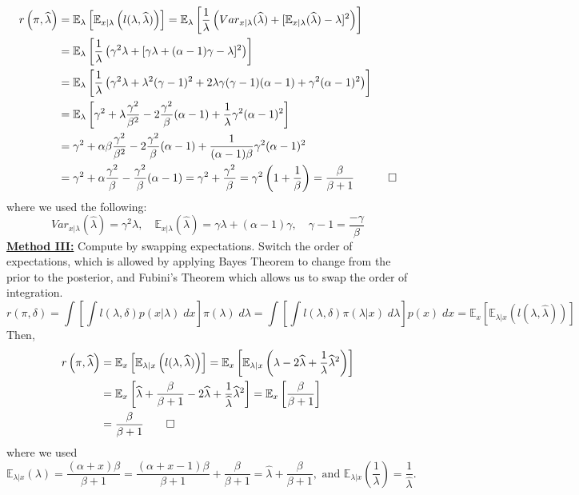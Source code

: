 \documentclass[11pt]{report}
\begin{document}
\begin{align*}
r\left(\pi, \widehat{\lambda}\right)
& = \mathbb{E}_\lambda\left[\mathbb{E}_{x|\lambda}\left(l(\lambda, \widehat{\lambda})\right) \right] 
= \mathbb{E}_\lambda\left[\frac{1}{\lambda}\left(Var_{x|\lambda}(\widehat{\lambda}) + [\mathbb{E}_{x|\lambda}(\widehat{\lambda}) -\lambda]^2 \right) \right] \\
& = \mathbb{E}_\lambda\left[\frac{1}{\lambda}\left(\gamma^2\lambda + [\gamma\lambda + (\alpha-1)\gamma-\lambda]^2 \right) \right] \\
& = \mathbb{E}_\lambda\left[\frac{1}{\lambda}\left(\gamma^2\lambda + \lambda^2(\gamma-1)^2 + 2\lambda\gamma(\gamma-1)(\alpha-1) + \gamma^2(\alpha-1)^2 \right) \right] \\
& = \mathbb{E}_\lambda\left[\gamma^2 + \lambda\frac{\gamma^2}{\beta^2} - 2\frac{\gamma^2}{\beta}(\alpha-1) + \frac{1}{\lambda}\gamma^2(\alpha-1)^2  \right] \\ 		
& = \gamma^2 + \alpha\beta\frac{\gamma^2}{\beta^2} - 2\frac{\gamma^2}{\beta}(\alpha-1) + \frac{1}{(\alpha-1)\beta}\gamma^2(\alpha-1)^2 \\   
& = \gamma^2 + \alpha\frac{\gamma^2}{\beta} - \frac{\gamma^2}{\beta}(\alpha-1)   		
= \gamma^2  + \frac{\gamma^2}{\beta}   		
= \gamma^2\left(1  + \frac{1}{\beta}\right)   	
= \frac{\beta}{\beta+1} \quad \qed 
\end{align*}
where we used the following:
$$Var_{x|\lambda}(\widehat{\lambda}) = \gamma^2\lambda, \quad  \mathbb{E}_{x|\lambda}(\widehat{\lambda}) = \gamma\lambda +(\alpha-1)\gamma, \quad \gamma-1 = \frac{-\gamma}{\beta} $$
\underline{\textbf{Method III:}} Compute by swapping expectations. \newline
Switch the order of expectations, which is allowed by applying Bayes Theorem to change from the prior to the posterior, and Fubini's Theorem which allows us to swap the order of integration.   
$$r(\pi, \delta) =  \int\left[ \int l(\lambda,\delta)p(x|\lambda) \;dx\right] \pi(\lambda)\; d\lambda = \int\left[ \int l(\lambda,\delta)\pi(\lambda|x) \;d\lambda\right] p(x)\; dx =  \mathbb{E}_x\left[\mathbb{E}_{\lambda|x}\left(l(\lambda, \widehat{\lambda})\right) \right]$$
Then, 
\begin{align*}
r\left(\pi, \widehat{\lambda}\right)
& = \mathbb{E}_x\left[\mathbb{E}_{\lambda|x}\left(l(\lambda, \widehat{\lambda})\right) \right] 
= \mathbb{E}_x\left[\mathbb{E}_{\lambda|x}\left(\lambda - 2\widehat{\lambda} + \frac{1}{\lambda}\widehat{\lambda}^2 \right) \right] \\
& = \mathbb{E}_x\left[\widehat{\lambda} + \frac{\beta}{\beta+1} - 2\widehat{\lambda} + \frac{1}{\widehat{\lambda}}\widehat{\lambda}^2  \right] 
= \mathbb{E}_x\left[\frac{\beta}{\beta+1}  \right] \\
& = \frac{\beta}{\beta+1}  \qed
\end{align*}
where we used 
$$\mathbb{E}_{\lambda|x}\left(\lambda\right) = \frac{(\alpha +x)\beta}{\beta+1} = \frac{(\alpha +x - 1)\beta}{\beta+1} + \frac{\beta}{\beta+1} = \widehat{\lambda} + \frac{\beta}{\beta+1},\text{ and } \mathbb{E}_{\lambda|x}\left(\frac{1}{\lambda}\right) = \frac{1}{\widehat{\lambda}}. $$
\end{document}
